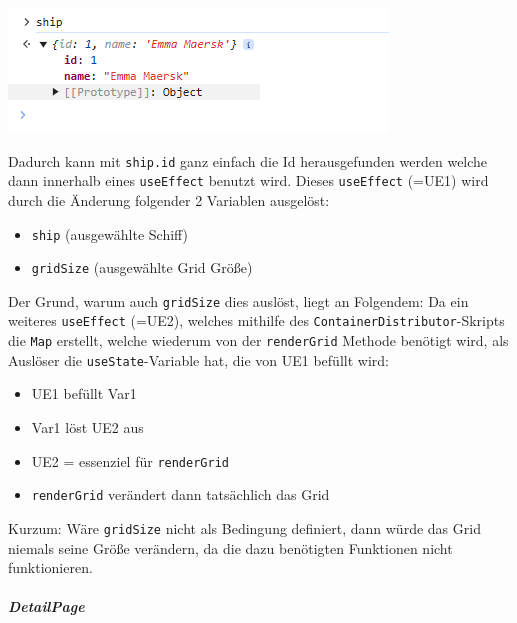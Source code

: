 \documentclass[
    headings=optiontotocandhead,%
    twoside,
    numbers=noenddot,%
    12pt, %
    titlepage, %
    parskip=full, %
    listof=leveldown, 
    numbers=noenddot, %
    a4paper,DIV=14,
    BCOR=15mm,
]{scrbook}
\newcommand{\passthrough}[1]{#1}
\let\origfigure=\figure
\let\endorigfigure=\endfigure
\renewenvironment{figure}[1][]{%
   \origfigure[H]
}{%
   \endorigfigure
}
\providecommand{\tightlist}{%
  \setlength{\itemsep}{0pt}\setlength{\parskip}{0pt}}
\begin{document}
\begin{figure}
\centering
\includegraphics{img/Gekle/ShipVar.png}
\caption{Aus Backend überliefertes selectedShip Objekt}
\end{figure}

Dadurch kann mit \passthrough{\lstinline!ship.id!} ganz einfach die Id
herausgefunden werden welche dann innerhalb eines
\passthrough{\lstinline!useEffect!} benutzt wird. Dieses
\passthrough{\lstinline!useEffect!} (=UE1) wird durch die Änderung
folgender 2 Variablen ausgelöst:

\begin{itemize}
\tightlist
\item
  \passthrough{\lstinline!ship!} (ausgewählte Schiff)
\item
  \passthrough{\lstinline!gridSize!} (ausgewählte Grid Größe)
\end{itemize}

Der Grund, warum auch \passthrough{\lstinline!gridSize!} dies auslöst,
liegt an Folgendem: Da ein weiteres \passthrough{\lstinline!useEffect!}
(=UE2), welches mithilfe des
\passthrough{\lstinline!ContainerDistributor!}-Skripts die
\passthrough{\lstinline!Map!} erstellt, welche wiederum von der
\passthrough{\lstinline!renderGrid!} Methode benötigt wird, als Auslöser
die \passthrough{\lstinline!useState!}-Variable hat, die von UE1 befüllt
wird:

\begin{itemize}
\tightlist
\item
  UE1 befüllt Var1
\item
  Var1 löst UE2 aus
\item
  UE2 = essenziel für \passthrough{\lstinline!renderGrid!}
\item
  \passthrough{\lstinline!renderGrid!} verändert dann tatsächlich das
  Grid
\end{itemize}

Kurzum: Wäre \passthrough{\lstinline!gridSize!} nicht als Bedingung
definiert, dann würde das Grid niemals seine Größe verändern, da die
dazu benötigten Funktionen nicht funktionieren.

\hypertarget{detailpage}{%
\subparagraph{DetailPage}\label{detailpage}}
\end{document}
